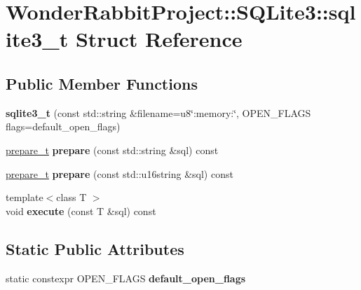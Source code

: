 \hypertarget{structWonderRabbitProject_1_1SQLite3_1_1sqlite3__t}{\section{Wonder\-Rabbit\-Project\-:\-:S\-Q\-Lite3\-:\-:sqlite3\-\_\-t Struct Reference}
\label{structWonderRabbitProject_1_1SQLite3_1_1sqlite3__t}
}
\subsection*{Public Member Functions}
\begin{DoxyCompactItemize}
\item 
\hypertarget{structWonderRabbitProject_1_1SQLite3_1_1sqlite3__t_a207d63cdead8470d3c4cc8dc7bd3741c}{{\bfseries sqlite3\-\_\-t} (const std\-::string \&filename=u8\char`\"{}\-:memory\-:\char`\"{}, O\-P\-E\-N\-\_\-\-F\-L\-A\-G\-S flags=default\-\_\-open\-\_\-flags)}\label{structWonderRabbitProject_1_1SQLite3_1_1sqlite3__t_a207d63cdead8470d3c4cc8dc7bd3741c}

\item 
\hypertarget{structWonderRabbitProject_1_1SQLite3_1_1sqlite3__t_a48293a0d6f5761b12f6c3461f44d50a7}{\hyperlink{structWonderRabbitProject_1_1SQLite3_1_1prepare__t}{prepare\-\_\-t} {\bfseries prepare} (const std\-::string \&sql) const }\label{structWonderRabbitProject_1_1SQLite3_1_1sqlite3__t_a48293a0d6f5761b12f6c3461f44d50a7}

\item 
\hypertarget{structWonderRabbitProject_1_1SQLite3_1_1sqlite3__t_a66a52fb4b6c1ff6af23c6d335db71489}{\hyperlink{structWonderRabbitProject_1_1SQLite3_1_1prepare__t}{prepare\-\_\-t} {\bfseries prepare} (const std\-::u16string \&sql) const }\label{structWonderRabbitProject_1_1SQLite3_1_1sqlite3__t_a66a52fb4b6c1ff6af23c6d335db71489}

\item 
\hypertarget{structWonderRabbitProject_1_1SQLite3_1_1sqlite3__t_a68801a4d2eed6d14c2475638caccf42a}{{\footnotesize template$<$class T $>$ }\\void {\bfseries execute} (const T \&sql) const }\label{structWonderRabbitProject_1_1SQLite3_1_1sqlite3__t_a68801a4d2eed6d14c2475638caccf42a}

\end{DoxyCompactItemize}
\subsection*{Static Public Attributes}
\begin{DoxyCompactItemize}
\item 
static constexpr O\-P\-E\-N\-\_\-\-F\-L\-A\-G\-S {\bfseries default\-\_\-open\-\_\-flags}
\end{DoxyCompactItemize}


